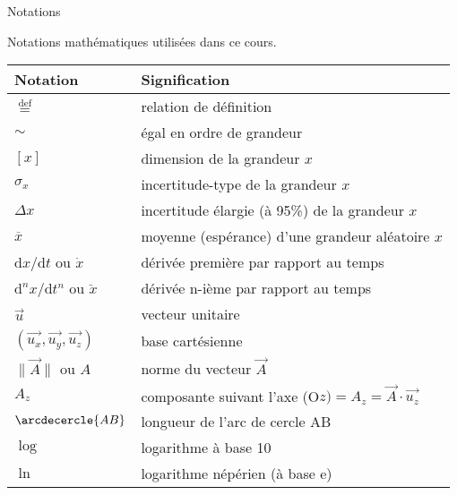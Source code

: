 {Notations} \\[2ex]

Notations mathématiques utilisées dans ce cours.
\begin{center}
    \begin{tabular}{@{} ll @{}} %
       \toprule	  
       \textbf{Notation}			& \textbf{Signification}\\
       \midrule
	   $\stackrel{\text{def}}=$					&relation de définition\\
	   $\sim$						&égal en ordre de grandeur\\
       \cmidrule(r){1-2}
	   $[x]$						&dimension de la grandeur $x$\\
	   $\sigma_x$					&incertitude-type de la grandeur $x$\\
	   $\Delta x$					&incertitude élargie (à 95\%) de la grandeur $x$\\
	   $\overline{x}$				&moyenne (espérance) d'une grandeur aléatoire $x$\\
	   $\mathrm{d} x/\mathrm{d} t$	ou $\dot x$&dérivée première par rapport au temps\\
	   $\mathrm{d}^n x/\mathrm{d} t^n$ ou $\ddot x$	&dérivée n-ième par rapport au temps\\
       \cmidrule(r){1-2}
	   $\overrightarrow{u}$			&vecteur unitaire\\
	   $(\overrightarrow{u_x},\overrightarrow{u_y},\overrightarrow{u_z})$	&base cartésienne\\
	   $\|\overrightarrow{A}\|$ ou $A$	&norme du vecteur $\overrightarrow{A}$\\
	   $A_{z}$						&composante suivant l'axe (O$z) =A_{z}=\overrightarrow{A}\cdot\overrightarrow{u_{z}}$\\	
      \cmidrule(r){1-2}
   		$\arcdecercle{AB}$			&longueur de l'arc de cercle AB\\
	    $\log$			&logarithme à base 10\\
	    $\ln$			&logarithme népérien (à base e)\\
 	  \bottomrule
    \end{tabular}
\end{center}

